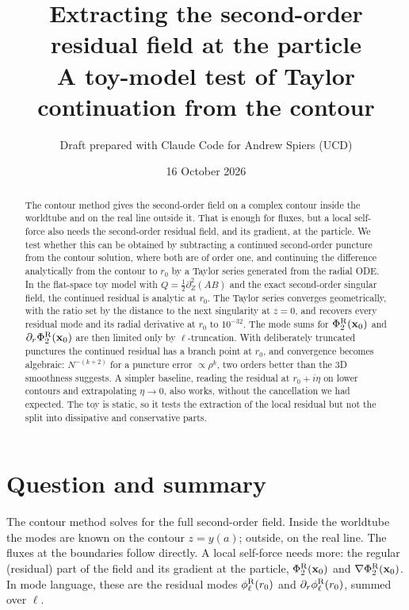 \documentclass[11pt,a4paper]{article}
\title{Extracting the second-order residual field at the particle\\[4pt]
\large A toy-model test of Taylor continuation from the contour}
\author{Draft prepared with Claude Code for Andrew Spiers (UCD)}
\date{16 October 2026}
\newcommand{\x}{\mathbf{x}}
\newcommand{\phiR}{\phi^{\rm R}_\ell}
\begin{document}
\maketitle

\begin{abstract}
The contour method gives the second-order field on a complex contour inside the worldtube and on the real line outside it.
That is enough for fluxes, but a local self-force also needs the second-order residual field, and its gradient, at the particle.
We test whether this can be obtained by subtracting a continued second-order puncture from the contour solution, where both are of order one, and continuing the difference analytically from the contour to $r_0$ by a Taylor series generated from the radial ODE.
In the flat-space toy model with $Q=\tfrac12\partial_Z^2(AB)$ and the exact second-order singular field, the continued residual is analytic at $r_0$.
The Taylor series converges geometrically, with the ratio set by the distance to the next singularity at $z=0$, and recovers every residual mode and its radial derivative at $r_0$ to $10^{-32}$.
The mode sums for $\Phi_2^{\rm R}(\x_0)$ and $\partial_r\Phi_2^{\rm R}(\x_0)$ are then limited only by $\ell$-truncation.
With deliberately truncated punctures the continued residual has a branch point at $r_0$, and convergence becomes algebraic: $N^{-(k+2)}$ for a puncture error $\propto\rho^k$, two orders better than the 3D smoothness suggests.
A simpler baseline, reading the residual at $r_0+i\eta$ on lower contours and extrapolating $\eta\to0$, also works, without the cancellation we had expected.
The toy is static, so it tests the extraction of the local residual but not the split into dissipative and conservative parts.
\end{abstract}

{\small\tableofcontents}

\section{Question and summary}
The contour method solves for the full second-order field.
Inside the worldtube the modes are known on the contour $z=y(a)$; outside, on the real line.
The fluxes at the boundaries follow directly.
A local self-force needs more: the regular (residual) part of the field and its gradient at the particle, $\Phi_2^{\rm R}(\x_0)$ and $\nabla\Phi_2^{\rm R}(\x_0)$.
In mode language, these are the residual modes $\phiR(r_0)$ and $\partial_r\phiR(r_0)$, summed over $\ell$.
\end{document}
